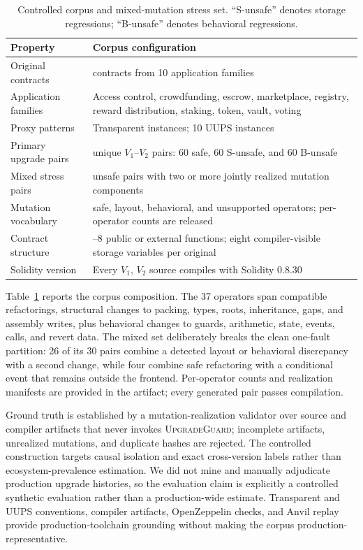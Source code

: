 \documentclass[runningheads]{llncs}
\newcommand{\tool}{\textsc{UpgradeGuard}\xspace}
\begin{document}
\begin{table}[t]
\caption{Controlled corpus and mixed-mutation stress set. ``S-unsafe'' denotes storage regressions; ``B-unsafe'' denotes behavioral regressions.}
\label{tab:dataset}
\centering
\scriptsize
\begin{tabular}{@{}>{\raggedright\arraybackslash}m{}>{\raggedright\arraybackslash}m{}@{}}
\toprule
Property & Corpus configuration \\
\midrule
Original contracts & 20 contracts from 10 application families \\
Application families & Access control, crowdfunding, escrow, marketplace, registry, reward distribution, staking, token, vault, voting \\
Proxy patterns & 10 Transparent instances; 10 UUPS instances \\
Primary upgrade pairs & 180 unique \(V_1\)--\(V_2\) pairs: 60 safe, 60 S-unsafe, and 60 B-unsafe \\
Mixed stress pairs & 30 unsafe pairs with two or more jointly realized mutation components \\
Mutation vocabulary & 37 safe, layout, behavioral, and unsupported operators; per-operator counts are released \\
Contract structure & 7--8 public or external functions; eight compiler-visible storage variables per original \\
Solidity version & Every \(V_1\), \(V_2\) source compiles with Solidity 0.8.30 \\
\bottomrule
\end{tabular}
\end{table}

Table~\ref{tab:dataset} reports the corpus composition. The 37 operators span compatible refactorings, structural changes to packing, types, roots, inheritance, gaps, and assembly writes, plus behavioral changes to guards, arithmetic, state, events, calls, and revert data. The mixed set deliberately breaks the clean one-fault partition: 26 of its 30 pairs combine a detected layout or behavioral discrepancy with a second change, while four combine safe refactoring with a conditional event that remains outside the frontend. Per-operator counts and realization manifests are provided in the artifact; every generated pair passes compilation.

Ground truth is established by a mutation-realization validator over source and compiler artifacts that never invokes \tool; incomplete artifacts, unrealized mutations, and duplicate hashes are rejected. The controlled construction targets causal isolation and exact cross-version labels rather than ecosystem-prevalence estimation. We did not mine and manually adjudicate production upgrade histories, so the evaluation claim is explicitly a controlled synthetic evaluation rather than a production-wide estimate. Transparent and UUPS conventions, compiler artifacts, OpenZeppelin checks, and Anvil replay provide production-toolchain grounding without making the corpus production-representative.
\end{document}
